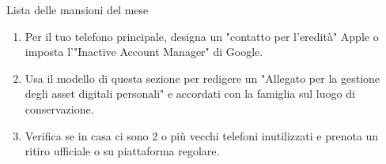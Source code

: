 \begin{tcbpractice}{Lista delle mansioni del mese}
\begin{enumerate}
  \item Per il tuo telefono principale, designa un "contatto per l'eredità" Apple o imposta l'"Inactive Account Manager" di Google.
  \item Usa il modello di questa sezione per redigere un "Allegato per la gestione degli asset digitali personali" e accordati con la famiglia sul luogo di conservazione.
  \item Verifica se in casa ci sono 2 o più vecchi telefoni inutilizzati e prenota un ritiro ufficiale o su piattaforma regolare.
\end{enumerate}

\end{tcbpractice}
